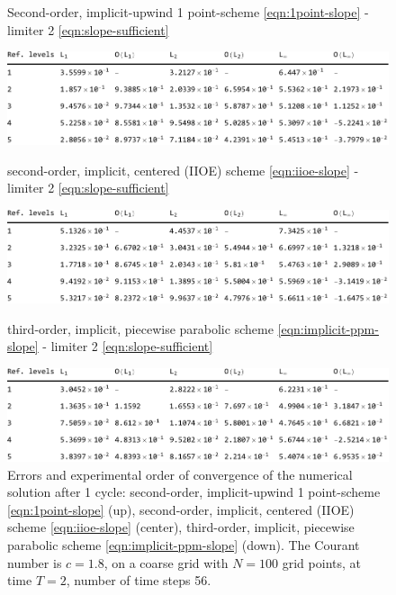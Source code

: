 \documentclass[../thesis.tex]{subfiles}
\begin{document}
\begin{figure}[H]
	\centering
    \caption*{Second-order, implicit-upwind 1 point-scheme \eqref{eqn:1point-slope} - limiter 2 \eqref{eqn:slope-sufficient}}
	\includegraphics[width=\textwidth]{../tab/tab-1point-c1p8-T2-limit2-shu.pdf}
    \caption*{second-order, implicit, centered (IIOE) scheme \eqref{eqn:iioe-slope} - limiter 2 \eqref{eqn:slope-sufficient}}
	\includegraphics[width=\textwidth]{../tab/tab-iioe-c1p8-T2-limit2-shu.pdf}
    \caption*{third-order, implicit, piecewise parabolic scheme \eqref{eqn:implicit-ppm-slope} - limiter 2 \eqref{eqn:slope-sufficient}}
	\includegraphics[width=\textwidth]{../tab/tab-implicit-ppm-c1p8-T2-limit2-shu.pdf}
	\caption{Errors and experimental order of convergence of the numerical solution after 1 cycle: second-order, implicit-upwind 1 point-scheme \eqref{eqn:1point-slope} (up), second-order, implicit, centered (IIOE) scheme \eqref{eqn:iioe-slope} (center), third-order, implicit, piecewise parabolic scheme \eqref{eqn:implicit-ppm-slope} (down). The Courant number is \(c = 1.8\), on a coarse grid with \(N = 100\) grid points, at time \(T = 2\), number of time steps 56.}
	\label{tab:c1p8-T2-limit2-shu}
\end{figure}
\end{document}
